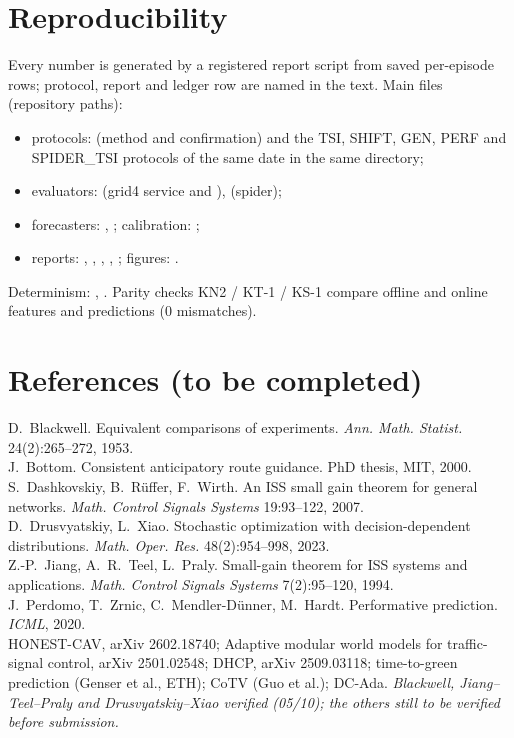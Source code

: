 \documentclass[11pt]{article}
\begin{document}
\section{Reproducibility}
Every number is generated by a registered report script from saved per-episode rows; protocol, report and ledger row are named in the
text. Main files (repository paths):
\begin{itemize}\setlength\itemsep{0pt}
\item protocols:  (method and confirmation) and the TSI, SHIFT, GEN, PERF and
SPIDER\_TSI protocols of the same date in the same directory;
\item evaluators:  (grid4 service and ),  (spider);
\item forecasters: , ; calibration: ;
\item reports: , , , ,
; figures: .
\end{itemize}
Determinism: , . Parity checks KN2 / KT-1 / KS-1 compare offline and online features and
predictions (0 mismatches).

\section*{References (to be completed)}
\small
D.~Blackwell. Equivalent comparisons of experiments. \emph{Ann. Math. Statist.} 24(2):265--272, 1953.\\
J.~Bottom. Consistent anticipatory route guidance. PhD thesis, MIT, 2000.\\
S.~Dashkovskiy, B.~R\"uffer, F.~Wirth. An ISS small gain theorem for general networks. \emph{Math. Control Signals Systems} 19:93--122, 2007.\\
D.~Drusvyatskiy, L.~Xiao. Stochastic optimization with decision-dependent distributions. \emph{Math. Oper. Res.} 48(2):954--998, 2023.\\
Z.-P.~Jiang, A.~R.~Teel, L.~Praly. Small-gain theorem for ISS systems and applications. \emph{Math. Control Signals Systems} 7(2):95--120, 1994.\\
J.~Perdomo, T.~Zrnic, C.~Mendler-D\"unner, M.~Hardt. Performative prediction. \emph{ICML}, 2020.\\
HONEST-CAV, arXiv 2602.18740; Adaptive modular world models for traffic-signal control, arXiv 2501.02548; DHCP, arXiv 2509.03118;
time-to-green prediction (Genser et al., ETH); CoTV (Guo et al.); DC-Ada. \emph{Blackwell, Jiang--Teel--Praly and Drusvyatskiy--Xiao verified (05/10); the others still to be verified before submission.}
\normalsize
\end{document}

